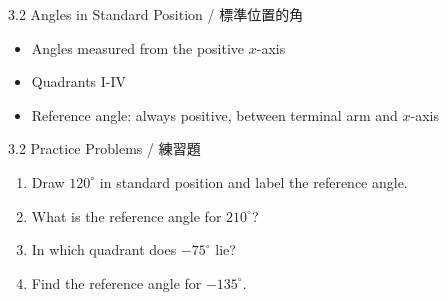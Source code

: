 \documentclass[aspectratio=169]{beamer}
\begin{document}
\begin{frame}{3.2 Angles in Standard Position / 標準位置的角}
    \begin{tcolorbox}[colback=lightgray,colframe=primary,title=Key Points]
        \footnotesize
        \begin{itemize}
            \item Angles measured from the positive $x$-axis
            \item Quadrants I-IV
            \item Reference angle: always positive, between terminal arm and $x$-axis
        \end{itemize}
    \end{tcolorbox}
    \vspace{0.5em}
    \begin{center}
    \end{center}
\end{frame}

\begin{frame}{3.2 Practice Problems / 練習題}
    \begin{tcolorbox}[colback=lightgray,colframe=accent,title=Practice]
        \footnotesize
        \begin{enumerate}
            \item Draw $120^\circ$ in standard position and label the reference angle.
            \item What is the reference angle for $210^\circ$?
            \item In which quadrant does $-75^\circ$ lie?
            \item Find the reference angle for $-135^\circ$.
        \end{enumerate}
    \end{tcolorbox}
\end{frame}
\end{document}

